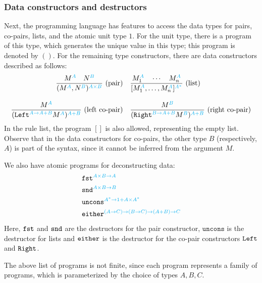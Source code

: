 \documentclass[a4paper,UKenglish,cleveref, autoref, thm-restate]{lipics-v2021}
\begin{document}
  \subsubsection{Data constructors and destructors} Next, the programming language has features to access the data types for pairs, co-pairs, lists, and the atomic unit type $1$.  For the unit type, there is a program of this type, which generates the unique value in this type; this program  is denoted by $()$. For the remaining type constructors, there are data constructors described as follows:
    \begin{align*}
    \frac{M^{{\color{cyan}A}} \quad N^{{\color{cyan}B}}}{(M^{{\color{cyan}A}},N^{{\color{cyan}B}})^{{\color{cyan}A \times B}}}\text{\ (pair)}
    & \quad 
    \frac{M_1^{{\color{cyan}A}} \quad \cdots \quad M_n^{{\color{cyan}A}}}{[M_1^{{\color{cyan}A}},\ldots,M_n^{{\color{cyan}A}}]^{{\color{cyan}A^*}}}\text{\ (list)} \\[0.3cm]
    \frac{M^{{\color{cyan}A}}}{(\mathtt{Left}^{{\color{cyan}A \to A+B}}M^{{\color{cyan}A}})^{{\color{cyan}A + B}}}\text{\ (left co-pair)}
    & \quad 
    \frac{M^{{\color{cyan}B}}}{(\mathtt{Right}^{{\color{cyan}B \to A + B}} M^{{\color{cyan}B}})^{{\color{cyan}A + B}}}\text{\ (right co-pair)}
    \end{align*}
    In the rule list, the program $[]$ is also allowed, representing the empty list. Observe that in the data constructors for co-pairs,  the other type $B$ (respectively, $A$) is part of the syntax, since it cannot be inferred from the argument $M$. 
   
    We also have  atomic programs for deconstructing data:
        \begin{align*}
& \mathtt{fst}^{{\color{cyan}A \times B \to A}} \\
& \mathtt{snd}^{{\color{cyan}A \times B \to B}} \\
& \mathtt{uncons}^{{\color{cyan}A^* \to 1 + A \times A^*}} \\
& \mathtt{either}^{{\color{cyan}(A \to C) \to (B \to C) \to (A + B) \to C}}    
\end{align*}
Here, $\mathtt{fst}$ and $\mathtt{snd}$ are the destructors for the pair constructor, 
$\mathtt{uncons}$ is the destructor for lists and $\mathtt{either}$ is the destructor for the co-pair 
constructors $ \mathtt{Left}$ and $ \mathtt{Right}$.

        The above list of programs is not finite, since each program represents a family of programs, which is parameterized by the choice of types $A,B,C$.
  
\end{document}
